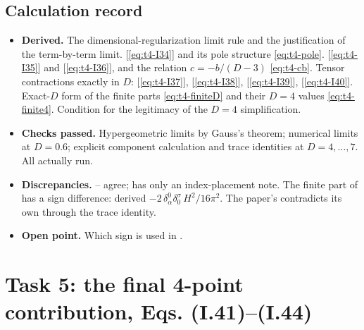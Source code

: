 \subsection{Calculation record}
\begin{itemize}
\item \textbf{Derived.} The dimensional-regularization limit rule and the justification of the
term-by-term limit.  [\eqref{eq:t4-I34}] and its pole structure \eqref{eq:t4-pole}.
 [\eqref{eq:t4-I35}] and  [\eqref{eq:t4-I36}], and the relation
\(c=-b/(D-3)\) \eqref{eq:t4-cb}. Tensor contractions exactly in \(D\): 
[\eqref{eq:t4-I37}],  [\eqref{eq:t4-I38}],  [\eqref{eq:t4-I39}], 
[\eqref{eq:t4-I40}]. Exact-\(D\) form of the finite parts \eqref{eq:t4-finiteD} and their
\(D=4\) values \eqref{eq:t4-finite4}. Condition for the legitimacy of the \(D=4\)
simplification.
\item \textbf{Checks passed.} Hypergeometric limits by Gauss's theorem; numerical limits at
\(D=0.6\); explicit component calculation and trace identities at \(D=4,\ldots,7\). All
actually run.
\item \textbf{Discrepancies.} -- agree;  has only an index-placement
note. The finite part of  has a sign difference: derived
\(-2\,\delta^0_\alpha\delta^\sigma_0\,H^2/16\pi^2\). The paper's  contradicts its own
 through the trace identity.
\item \textbf{Open point.} Which sign is used in .
\end{itemize}

\section{Task 5: the final 4-point contribution, Eqs. (I.41)--(I.44)}
\label{sec:t5}

